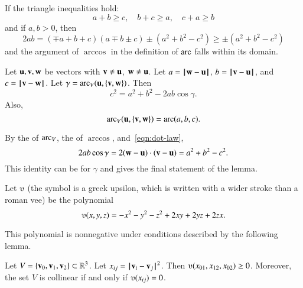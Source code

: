 If the triangle inequalities hold:
\[ 
a + b \ge c,\quad b + c \ge a, \quad c+a \ge b
\] 
and if $a,b >0$, then
\[ 
  2 a b = (\mp a+b+c)(a \mp b \pm c) \pm (a^2 + b^2 - c^2) 
\ge \pm  (a^2 + b^2 - c^2)
\] 
and the argument of $\arccos$ in the definition of $\operatorname{arc}$ falls within
its domain.

\begin{lemma}\label{lemma:loc}
Let ${\mathbf u},{\mathbf v},{\mathbf w}$ be vectors with ${\mathbf v}\ne {\mathbf u}$, ${\mathbf w}\ne {\mathbf u}$.  Let $a
= \norm{\w }{ \u}$, $b = \norm{\v }{ \u}$, and $c = \norm{\v }{ \w}$.
Let $\gamma=\operatorname{arc}_V({\mathbf u},\{{\mathbf v},{\mathbf w}\})$.    Then
\[ c^2 = a^2 + b^2 - 2 a b \cos\gamma.\] 
Also,
\[ 
\operatorname{arc}_V({\mathbf u},\{{\mathbf v},{\mathbf w}\})= \operatorname{arc}(a,b,c).
\] 

\end{lemma}
%
%
%
%

\begin{proved}
By the  of $\operatorname{arc}_V$, the
 of $\arccos$, and~\eqref{eqn:dot-law},
\[ 
2 a b \cos \gamma = 2 ({\mathbf w} - {\mathbf u})\cdot ({\mathbf v} - {\mathbf u}) = a^2 + b^2 - c^2.
\] 
This identity can be  for $\gamma$ and
 gives the final statement of the lemma.  \swallowed\end{proved}


\begin{definition}[$\ups$]\label{def:ups}
Let $\ups$ (the symbol is a greek upsilon, which is written with a
wider stroke than a roman vee) be the polynomial
\[ \ups(x,y,z) = -x^2 - y^2 - z^2 + 2 x y + 2 y z + 2
  z x.\] 
%
\end{definition}



This polynomial is nonnegative under conditions described by the
following lemma. 


\begin{lemma}[]\label{lemma:ups} Let
  $V=\{{\mathbf v}_0,{\mathbf v}_1,{\mathbf v}_2\}\subset\mathbb{R}^3$.  Let $x_{ij} =
  \norm{\v_i}{\v_j}^2$.  Then $\ups(x_{01},x_{12},x_{02})\ge 0$.
  Moreover, the set $V$ is collinear if and only if $\ups(x_{ij}) =
  0$.%
\end{lemma}

